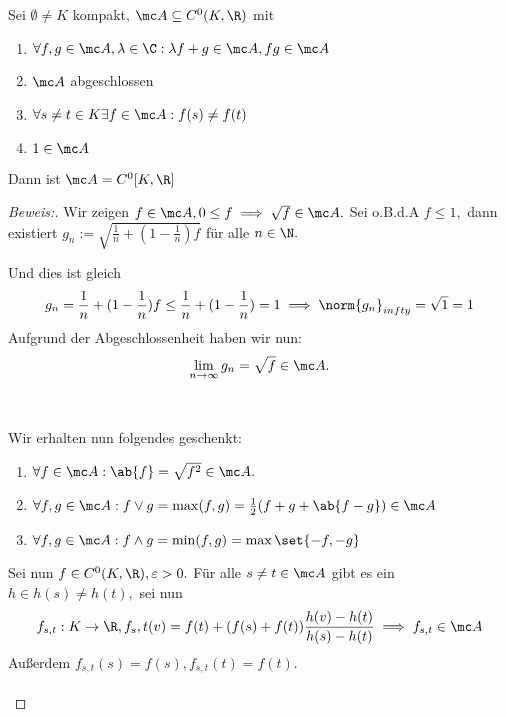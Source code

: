 \begin{theorem} \label{algebraquatsch} Sei $\emptyset \not= K$ kompakt, $\mc A \subseteq C^0(K, \R)$ mit 
	
	\begin{enumerate}
		
		\item $\forall f, g \in \mc A, \lambda \in \C: \lambda f +g \in \mc A, fg \in \mc A$
		
		\item $\mc A$ abgeschlossen
		
		\item $\forall s \not= t \in K \exists f \in \mc A: f(s) \not= f(t)$
		
		\item $1 \in \mc A$
		
	\end{enumerate}
	
	Dann ist $\mc A = C^0[K, \R]$
	
	\begin{proof}[Beweis:] Wir zeigen $f \in \mc A, 0 \leq f \implies \sqrt{f} \in \mc A.$ Sei o.B.d.A $f \leq 1,$ dann existiert $g_n := \sqrt{\frac{1}{n}+(1- \frac{1}{n})f}$ für alle $n \in \N.$
		
		 Und dies ist gleich \[g_n = \frac{1}{n}+ (1- \frac{1}{n})f \leq \frac{1}{n}+(1- \frac{1}{n}) = 1 \implies \norm{g_n}_{infty} = \sqrt{1} = 1\] Aufgrund der Abgeschlossenheit haben wir nun: \[\lim_{n \to \infty} g_n = \sqrt{f} \in \mc A.\] \\ \\
		
		Wir erhalten nun folgendes geschenkt:
		
		\begin{enumerate}
			
			\item $\forall f \in \mc A: \ab{f} = \sqrt{f^2} \in \mc A.$
			\item $\forall f, g \in \mc A: f \lor g = \max(f, g) = \frac{1}{2}(f+g+ \ab{f-g}) \in \mc A$
			\item $\forall f, g \in \mc A: f \land g = \min(f, g) = \max{\set{-f, -g}}$
			
		\end{enumerate}
		
		Sei nun $f \in C^0(K, \R), \varepsilon > 0.$ Für alle $s \not= t \in \mc A$ gibt es ein $h \in h(s) \not= h(t),$ sei nun \[f_{s, t}: K \to \R, f_s,t(v) = f(t)+(f(s)+f(t))\frac{h(v)-h(t)}{h(s)-h(t)} \implies f_{s, t} \in \mc A\] Außerdem $f_{s, t}(s) = f(s), f_{s, t}(t) = f(t).$ \\ \\
		

\end{proof}
\end{theorem}
